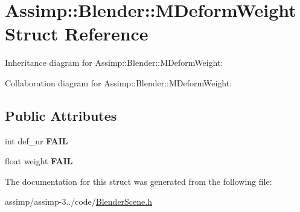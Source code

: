 \hypertarget{struct_assimp_1_1_blender_1_1_m_deform_weight}{\section{Assimp\+:\+:Blender\+:\+:M\+Deform\+Weight Struct Reference}
\label{struct_assimp_1_1_blender_1_1_m_deform_weight}
}


Inheritance diagram for Assimp\+:\+:Blender\+:\+:M\+Deform\+Weight\+:


Collaboration diagram for Assimp\+:\+:Blender\+:\+:M\+Deform\+Weight\+:
\subsection*{Public Attributes}
\begin{DoxyCompactItemize}
\item 
\hypertarget{struct_assimp_1_1_blender_1_1_m_deform_weight_af6d5de2736f47289d145d4d4a7b03403}{int def\+\_\+nr {\bfseries F\+A\+I\+L}}\label{struct_assimp_1_1_blender_1_1_m_deform_weight_af6d5de2736f47289d145d4d4a7b03403}

\item 
\hypertarget{struct_assimp_1_1_blender_1_1_m_deform_weight_a610b2714911a0b2893b93647bee32c4b}{float weight {\bfseries F\+A\+I\+L}}\label{struct_assimp_1_1_blender_1_1_m_deform_weight_a610b2714911a0b2893b93647bee32c4b}

\end{DoxyCompactItemize}


The documentation for this struct was generated from the following file\+:\begin{DoxyCompactItemize}
\item 
assimp/assimp-\/3../code/\hyperlink{_blender_scene_8h}{Blender\+Scene.\+h}\end{DoxyCompactItemize}
